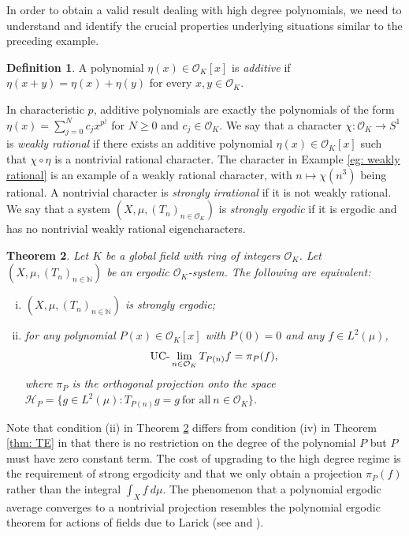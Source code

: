 \documentclass{amsart}
\newtheorem{theorem}{Theorem}[section]
\theoremstyle{definition}
\newtheorem{definition}[theorem]{Definition}
\numberwithin{equation}{section}
\newcommand{\N}{\mathbb{N}}
\newcommand{\mO}{\mathcal{O}}
\newcommand{\UClim}{\textup{UC-}\lim}
\newcommand{\Hil}{\mathcal{H}}
\begin{document}
In order to obtain a valid result dealing with high degree polynomials, we need to understand and identify the crucial properties underlying situations similar to the preceding example.

\begin{definition} \label{defn: additive}
    A polynomial $\eta(x) \in \mO_K[x]$ is \emph{additive} if $\eta(x+y) = \eta(x) + \eta(y)$ for every $x, y \in \mO_K$.
\end{definition}

In characteristic $p$, additive polynomials are exactly the polynomials of the form $\eta(x) = \sum_{j=0}^N c_j x^{p^j}$ for $N \ge 0$ and $c_j \in \mO_K$.
We say that a character $\chi : \mO_K \to S^1$ is \emph{weakly rational} if there exists an additive polynomial $\eta(x) \in \mO_K[x]$ such that $\chi \circ \eta$ is a nontrivial rational character.
The character in Example \ref{eg: weakly rational} is an example of a weakly rational character, with $n \mapsto \chi(n^3)$ being rational.
A nontrivial character is \emph{strongly irrational} if it is not weakly rational.
We say that a system $(X, \mu, (T_n)_{n \in \mO_K})$ is \emph{strongly ergodic} if it is ergodic and has no nontrivial weakly rational eigencharacters.

\begin{theorem} \label{thm: strongly ergodic}
    Let $K$ be a global field with ring of integers $\mO_K$.
    Let $(X, \mu, (T_n)_{n \in \N})$ be an ergodic $\mO_K$-system.
    The following are equivalent:
    \begin{enumerate}[(i)]
        \item $(X, \mu, (T_n)_{n \in \N})$ is strongly ergodic;
        \item for any polynomial $P(x) \in \mO_K[x]$ with $P(0) = 0$ and any $f \in L^2(\mu)$,
			\begin{equation*}
				\UClim_{n \in \mO_K} T_{P(n)} f = \pi_P(f),
			\end{equation*}
			where $\pi_P$ is the orthogonal projection onto the space $\Hil_P = \{g \in L^2(\mu) : T_{P(n)} g = g~\text{for all}~n \in \mO_K\}$.
    \end{enumerate}
\end{theorem}

Note that condition (ii) in Theorem \ref{thm: strongly ergodic} differs from condition (iv) in Theorem \ref{thm: TE} in that there is no restriction on the degree of the polynomial $P$ but $P$ must have zero constant term.
The cost of upgrading to the high degree regime is the requirement of strong ergodicity and that we only obtain a projection $\pi_P(f)$ rather than the integral $\int_X f~d\mu$.
The phenomenon that a polynomial ergodic average converges to a nontrivial projection resembles the polynomial ergodic theorem for actions of fields due to Larick (see \cite{larick} and \cite[Theorem 3.10]{blm}).
\end{document}
